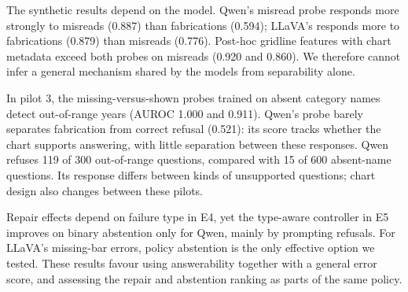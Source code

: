 The synthetic results depend on the model. Qwen's misread probe responds more
strongly to misreads (0.887) than fabrications (0.594); LLaVA's responds more
to fabrications (0.879) than misreads (0.776). Post-hoc gridline features with
chart metadata exceed both probes on misreads (0.920 and 0.860). We therefore
cannot infer a general mechanism shared by the models from separability alone.

In pilot 3, the missing-versus-shown probes trained on absent category names
detect out-of-range years (AUROC 1.000 and 0.911). Qwen's probe barely separates
fabrication from correct refusal (0.521): its score tracks whether the chart supports answering, with
little separation between these responses. Qwen refuses 119 of 300
out-of-range questions, compared with 15 of 600 absent-name questions.
Its response differs between kinds of unsupported questions; chart design
also changes between these pilots.

Repair effects depend on failure type in E4, yet the type-aware controller
in E5 improves on binary abstention only for Qwen, mainly by prompting
refusals. For LLaVA's missing-bar errors, policy abstention is the only
effective option we tested. These results favour using answerability together
with a general error score, and assessing the repair and abstention ranking
as parts of the same policy.
